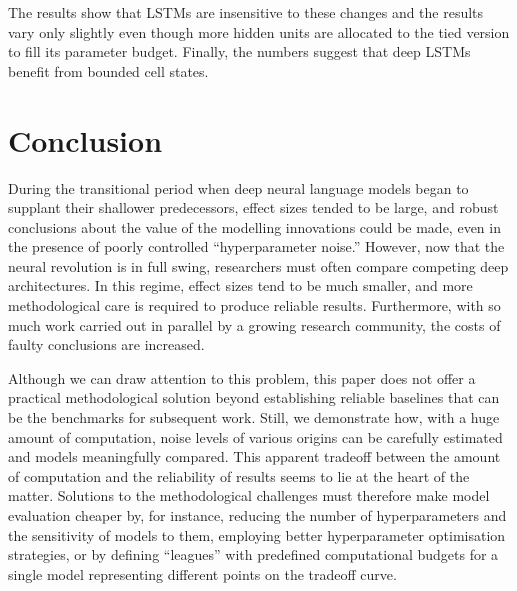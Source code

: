 \documentclass[letter]{article} \usepackage{iclr2018_conference,times}
\begin{document}
The results show that LSTMs are insensitive to these changes and the
results vary only slightly even though more hidden units are allocated
to the tied version to fill its parameter budget. Finally, the numbers
suggest that deep LSTMs benefit from bounded cell states.

\section{Conclusion}

During the transitional period when deep neural language models began
to supplant their shallower predecessors, effect sizes tended to be
large, and robust conclusions about the value of the modelling
innovations could be made, even in the presence of poorly controlled
``hyperparameter noise.'' However, now that the neural revolution is
in full swing, researchers must often compare competing deep
architectures. In this regime, effect sizes tend to be much smaller,
and more methodological care is required to produce reliable results.
Furthermore, with so much work carried out in parallel by a growing
research community, the costs of faulty conclusions are increased.

Although we can draw attention to this problem, this paper does not
offer a practical methodological solution beyond establishing reliable
baselines that can be the benchmarks for subsequent work. Still, we
demonstrate how, with a huge amount of computation, noise levels of
various origins can be carefully estimated and models meaningfully
compared. This apparent tradeoff between the amount of computation and
the reliability of results seems to lie at the heart of the matter.
Solutions to the methodological challenges must therefore make model
evaluation cheaper by, for instance, reducing the number of
hyperparameters and the sensitivity of models to them, employing
better hyperparameter optimisation strategies, or by defining
``leagues'' with predefined computational budgets for a single model
representing different points on the tradeoff curve.



\end{document}
